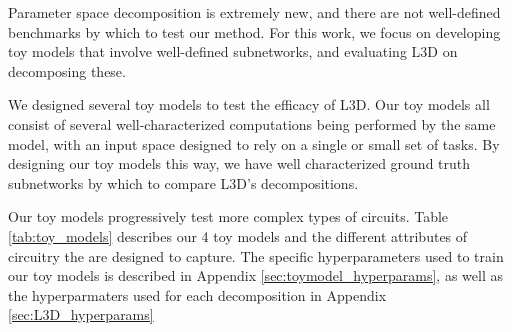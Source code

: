 \documentclass{article}
\theoremstyle{plain}
\theoremstyle{definition}
\theoremstyle{remark}
\begin{document}
Parameter space decomposition is extremely new, and there are not well-defined benchmarks by which to test our method. For this work, we focus on developing toy models that involve well-defined subnetworks, and evaluating L3D on decomposing these.

We designed several toy models to test the efficacy of L3D. Our toy models all consist of several well-characterized computations being performed by the same model, with an input space designed to rely on a single or small set of tasks. By designing our toy models this way, we have well characterized ground truth subnetworks by which to compare L3D's decompositions.

Our toy models progressively test more complex types of circuits. Table \ref{tab:toy_models} describes our 4 toy models and the different attributes of circuitry the are designed to capture. The specific hyperparameters used to train our toy models is described in Appendix \ref{sec:toymodel_hyperparams}, as well as the hyperparmaters used for each decomposition in Appendix \ref{sec:L3D_hyperparams}
\end{document}
